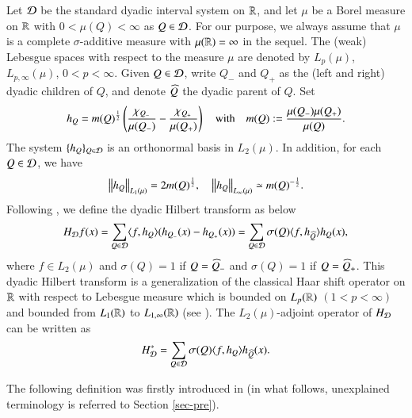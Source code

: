 \documentclass[leqno]{amsart}
\begin{document}
Let ${\mathcal D}$ be the standard dyadic interval system on ${\mathbb R}$, and let $\mu$ be a Borel measure on ${\mathbb R}$ with $0<\mu(Q)<\infty$ as $Q\in{\mathcal D}$. For our purpose, we always assume that $\mu$ is a complete $\sigma$-additive measure with $\mu({\mathbb R})=\infty$ in the sequel. The (weak) Lebesgue spaces with respect to the measure $\mu$ are denoted by $L_p(\mu)$, $L_{p,\infty}(\mu)$, $0<p<\infty$. Given $Q\in{\mathcal D}$, write $Q_{-}$ and $Q_{+}$ as the (left and right) dyadic children of $Q$, and denote $\widehat{Q}$ the dyadic parent of $Q$.  
Set
\begin{align*}
h_{Q}=m(Q)^{\frac{1}{2}}\left(\frac{\chi_{Q_{-}}}{\mu(Q_{-})}-\frac{\chi_{Q_{+}}}{\mu(Q_{+})}\right)
\quad{\rm with}\quad m(Q):=\frac{\mu(Q_{-})\mu(Q_{+})}{\mu(Q)}.
\end{align*}
The system $\{h_{Q}\}_{Q\in{\mathcal D}}$ is an orthonormal basis in $L_{2}(\mu)$. 
In addition, for each $Q\in{\mathcal D}$, we have 
\begin{align}\label{hQ norm}
\left\| h_{Q} \right\|_{L_{1}(\mu)}=2m(Q)^{\frac{1}{2}},\quad\left\| h_{Q} \right\|_{L_{\infty}(\mu)}\simeq m(Q)^{-\frac{1}{2}}.
\end{align}
Following \cite[page 50]{LMP2014}, we define the dyadic Hilbert transform as below
\begin{align*}
H_{{\mathcal D}}f(x)=\sum_{Q\in{\mathcal D}}\langle f,h_{Q} \rangle(h_{Q_{-}}(x)-h_{Q_{+}}(x))
=\sum_{Q\in{\mathcal D}}\sigma(Q)\langle f,h_{\widehat{Q}} \rangle h_{Q}(x),
\end{align*}
where $f\in L_{2}(\mu)$ and $\sigma(Q)=1$ if $Q=\widehat{Q}_{-}$ and $\sigma(Q)=1$ if $Q=\widehat{Q}_{+}$. 
This dyadic Hilbert transform is a generalization of the classical Haar shift operator on ${\mathbb R}$ with respect to Lebesgue measure which is bounded on $L_{p}({\mathbb R})$ $(1<p<\infty)$ and bounded from $L_{1}({\mathbb R})$ to $L_{1,\infty}({\mathbb R})$ (see \cite{CMP2012}).
The $L_{2}(\mu)$-adjoint operator of $H_{{\mathcal D}}$ can be written as $$H_{{\mathcal D}}^{*}=\sum_{Q\in{\mathcal D}}\sigma(Q)\langle f,h_{Q} \rangle h_{\widehat{Q}}(x).$$

The following definition was firstly introduced in \cite[page 50]{LMP2014} (in what follows, unexplained terminology is referred to Section \ref{sec-pre}). 
\end{document}
